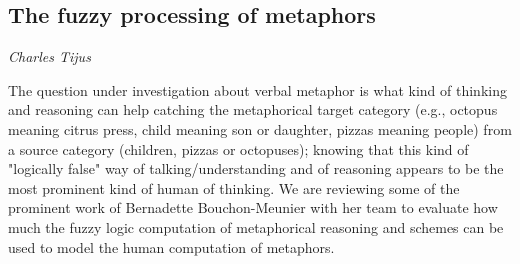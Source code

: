 \documentclass[../booklet.tex]{subfiles}
\begin{document}
\subsection[The fuzzy processing of metaphors. {\it Charles Tijus}]{The fuzzy processing of metaphors}

\begin{center}
  {\it Charles Tijus}
\end{center}


The question under investigation about verbal metaphor is what kind of thinking and reasoning can help catching the metaphorical target category (e.g., octopus meaning citrus press,  child meaning son or daughter,  pizzas meaning people) from a source category (children, pizzas or octopuses); knowing that this kind of "logically false" way of talking/understanding and of reasoning appears to be the most prominent kind of human of thinking. We are reviewing some of the prominent work of Bernadette Bouchon-Meunier with her team to evaluate how much the fuzzy logic computation of metaphorical reasoning and schemes can be used to model the human computation of metaphors.

\end{document}
